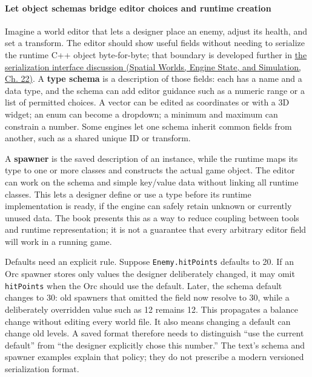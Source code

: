\paragraph{Let object schemas bridge editor choices and runtime creation}\label{06-engine-ii-ch032-let-object-schemas-bridge-editor-choices-and-runtime-creation}

\hypertarget{06-engine-ii-ch032-let-object-schemas-bridge-editor-choices-and-runtime-creation}{}

Imagine a world editor that lets a designer place an enemy, adjust its health, and set a transform. The editor should show useful fields without needing to serialize the runtime C++ object byte-for-byte; that boundary is developed further in \href{../05-Spatial-Worlds-Engine-State-and-Simulation/main.pdf\#nameddest=06-engine-ii-ch033-serialization-is-an-interface-between-tools-and-execution}{the serialization interface discussion (Spatial Worlds, Engine State, and Simulation, Ch. 22)}. A \textbf{type schema} is a description of those fields: each has a name and a data type, and the schema can add editor guidance such as a numeric range or a list of permitted choices. A vector can be edited as coordinates or with a 3D widget; an enum can become a dropdown; a minimum and maximum can constrain a number. Some engines let one schema inherit common fields from another, such as a shared unique ID or transform.

A \textbf{spawner} is the saved description of an instance, while the runtime maps its type to one or more classes and constructs the actual game object. The editor can work on the schema and simple key/value data without linking all runtime classes. This lets a designer define or use a type before its runtime implementation is ready, if the engine can safely retain unknown or currently unused data. The book presents this as a way to reduce coupling between tools and runtime representation; it is not a guarantee that every arbitrary editor field will work in a running game.

Defaults need an explicit rule. Suppose \texttt{Enemy.hitPoints} defaults to 20. If an Orc spawner stores only values the designer deliberately changed, it may omit \texttt{hitPoints} when the Orc should use the default. Later, the schema default changes to 30: old spawners that omitted the field now resolve to 30, while a deliberately overridden value such as 12 remains 12. This propagates a balance change without editing every world file. It also means changing a default can change old levels. A saved format therefore needs to distinguish ``use the current default'' from ``the designer explicitly chose this number.'' The text's schema and spawner examples explain that policy; they do not prescribe a modern versioned serialization format.

